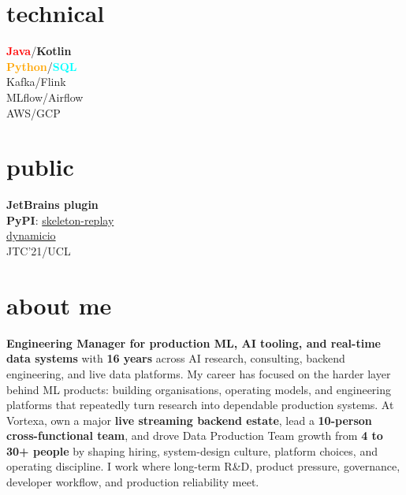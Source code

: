 \documentclass[]{../../../../friggeri-cv}
\begin{document}
\begin{aside}
			\section{technical}
			{\footnotesize \textbf{\textcolor{red}{Java}}/\textbf{\textcolor{red!50!black}{Kotlin}}\\\textbf{\textcolor{orange}{Python}}/\textbf{\textcolor{cyan}{SQL}}\\Kafka/Flink\\MLflow/Airflow\\AWS/GCP}
			\section{public}
			{\footnotesize \textbf{JetBrains plugin}\\\textbf{PyPI}: \href{https://pypi.org/project/skeleton-replay/}{skeleton-replay}\\\href{https://pypi.org/project/dynamicio/}{dynamicio}\\JTC'21/UCL}
	\end{aside}

\section{about me}
{\small \textbf{Engineering Manager for production ML, AI tooling, and real-time data systems} with \textbf{16 years} across AI research, consulting, backend engineering, and live data platforms. My career has focused on the harder layer behind ML products: building organisations, operating models, and engineering platforms that repeatedly turn research into dependable production systems. At Vortexa, own a major \textbf{live streaming backend estate}, lead a \textbf{10-person cross-functional team}, and drove Data Production Team growth from \textbf{4 to 30+ people} by shaping hiring, system-design culture, platform choices, and operating discipline. I work where long-term R\&D, product pressure, governance, developer workflow, and production reliability meet.}
\end{document}
